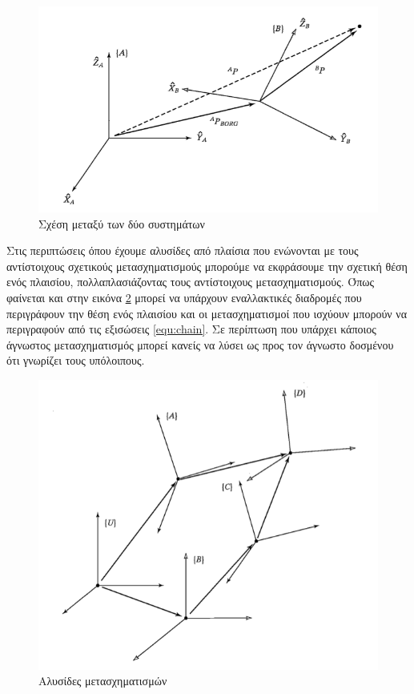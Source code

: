 \begin{figure}[H]
    \centering
    \includegraphics[width=.7\textwidth, keepaspectratio]{fig/transofrmation.png}
    \caption{Σχέση μεταξύ των δύο συστημάτων \cite{craig95}}
    \label{fig:transformation}
\end{figure}

Στις περιπτώσεις όπου έχουμε αλυσίδες από πλαίσια που ενώνονται με τους αντίστοιχους σχετικούς μετασχηματισμούς μπορούμε να εκφράσουμε την σχετική θέση ενός πλαισίου, πολλαπλασιάζοντας τους αντίστοιχους μετασχηματισμούς. Όπως φαίνεται και στην εικόνα \ref{fig:transformation-chain} μπορεί να υπάρχουν εναλλακτικές διαδρομές που περιγράφουν την θέση ενός πλαισίου και οι μετασχηματισμοί που ισχύουν μπορούν να περιγραφούν από τις εξισώσεις \ref{equ:chain}. Σε περίπτωση που υπάρχει κάποιος άγνωστος μετασχηματισμός μπορεί κανείς να λύσει ως προς τον άγνωστο δοσμένου ότι γνωρίζει τους υπόλοιπους.

\begin{figure}[H]
    \centering
    \includegraphics[width=.7\textwidth, height=.4\textheight, keepaspectratio]{fig/transformation-chain.png}
    \caption{Αλυσίδες μετασχηματισμών \cite{craig95}}
    \label{fig:transformation-chain}
\end{figure}

